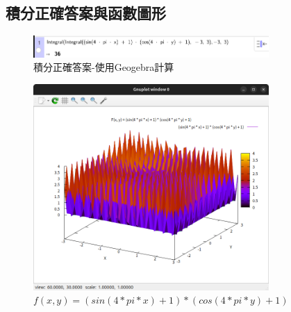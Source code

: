 \documentclass[a4paper,12pt]{article}
\begin{document}
\subsection{積分正確答案與函數圖形}
\begin{figure}[H]
    \centering
    \includegraphics[width=0.8\textwidth]{./img/ggb_integral.png}
    \caption{積分正確答案-使用Geogebra計算}
\end{figure}
\begin{figure}[H]
    \centering
    \includegraphics[width=0.8\textwidth]{./img/func_image.png}
    \caption{$f(x,y) = (sin(4 * pi * x) + 1) * (cos(4 * pi * y) + 1)$}
\end{figure}
\end{document}
